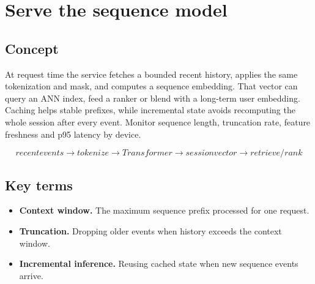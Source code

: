 \section{Serve the sequence model}

\begin{abstract}
The online state must reproduce training semantics without rebuilding an unlimited history.
\end{abstract}

\subsection{Concept}
At request time the service fetches a bounded recent history, applies the same tokenization and mask, and computes a sequence embedding. That vector can query an ANN index, feed a ranker or blend with a long-term user embedding. Caching helps stable prefixes, while incremental state avoids recomputing the whole session after every event. Monitor sequence length, truncation rate, feature freshness and p95 latency by device.

\begin{equation*}
recent events \rightarrow tokenize \rightarrow Transformer \rightarrow session vector \rightarrow retrieve / rank
\end{equation*}

\subsection{Key terms}
\begin{itemize}
\item \textbf{Context window.} The maximum sequence prefix processed for one request.
\item \textbf{Truncation.} Dropping older events when history exceeds the context window.
\item \textbf{Incremental inference.} Reusing cached state when new sequence events arrive.
\end{itemize}
